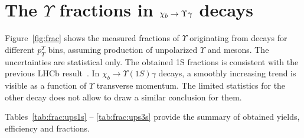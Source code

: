 \section{The \texorpdfstring{$\Upsilon$}{Y} fractions in \texorpdfstring{$\chi_{b} \rightarrow \Upsilon \gamma$}{chib --> Y gamma} decays}
\label{sec:mc}

Figure~\ref{fig:frac} shows the measured fractions of $\Upsilon$ originating
from \chib decays for different $p_T^{\Upsilon}$ bins,  assuming production of
unpolarized $\Upsilon$ and \chib mesons. The uncertainties are statistical
only. The obtained \Y1S fractions is consistent with the previous LHCb
result~\cite{LHCb-PAPER-2012-015}. In $\chi_b \rightarrow \Upsilon(1S) \gamma$
decays, a smoothly increasing trend is visible as a function of $\Upsilon$
transverse momentum. The limited statistics for the other decay does not allow
to draw a similar conclusion for them.




Tables~\ref{tab:frac:ups1s} -- \ref{tab:frac:ups3s} provide the summary
of obtained yields, efficiency and fractions.


